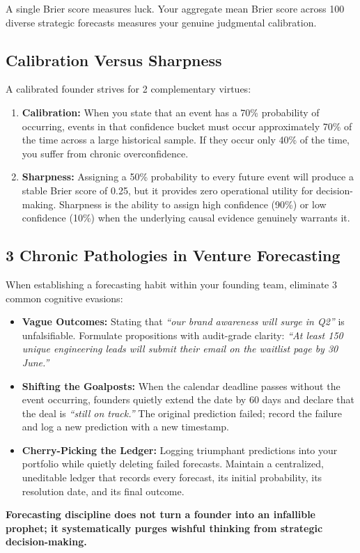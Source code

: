 A single Brier score measures luck. Your aggregate mean Brier score across 100 diverse strategic forecasts measures your genuine judgmental calibration.

\subsection{Calibration Versus Sharpness}

A calibrated founder strives for 2 complementary virtues:

\begin{enumerate}[leftmargin=12pt,itemsep=2pt,topsep=1pt,parsep=0pt]
  \item \textbf{Calibration:} When you state that an event has a 70\% probability of occurring, events in that confidence bucket must occur approximately 70\% of the time across a large historical sample. If they occur only 40\% of the time, you suffer from chronic overconfidence.
  \item \textbf{Sharpness:} Assigning a 50\% probability to every future event will produce a stable Brier score of 0.25, but it provides zero operational utility for decision-making. Sharpness is the ability to assign high confidence (90\%) or low confidence (10\%) when the underlying causal evidence genuinely warrants it.
\end{enumerate}

\subsection{3 Chronic Pathologies in Venture Forecasting}

When establishing a forecasting habit within your founding team, eliminate 3 common cognitive evasions:
\begin{itemize}[leftmargin=10pt,itemsep=1pt,topsep=1pt]
  \item \textbf{Vague Outcomes:} Stating that \textit{``our brand awareness will surge in Q2''} is unfalsifiable. Formulate propositions with audit-grade clarity: \textit{``At least 150 unique engineering leads will submit their email on the waitlist page by 30 June.''}
  \item \textbf{Shifting the Goalposts:} When the calendar deadline passes without the event occurring, founders quietly extend the date by 60 days and declare that the deal is \textit{``still on track.''} The original prediction failed; record the failure and log a new prediction with a new timestamp.
  \item \textbf{Cherry-Picking the Ledger:} Logging triumphant predictions into your portfolio while quietly deleting failed forecasts. Maintain a centralized, uneditable ledger that records every forecast, its initial probability, its resolution date, and its final outcome.
\end{itemize}

\textbf{Forecasting discipline does not turn a founder into an infallible prophet; it systematically purges wishful thinking from strategic decision-making.}
